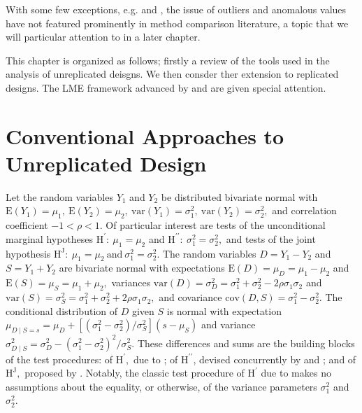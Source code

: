 \documentclass[12pt, a4paper]{report}
\theoremstyle{plain}
\theoremstyle{definition}
\theoremstyle{remark}
\begin{document}
With some few exceptions, e.g. \citet{hawkins1978} and \citet{Bartko}, the issue of outliers and anomalous values have not featured prominently in method comparison literature, a topic that we will particular attention to in a later chapter.


This chapter is organized as follows; firstly a review of the tools used in the analysis of unreplicated deisgns. We then consder ther extension to replicated designs. The LME framework advanced by \citet{BXC2008} and \citet{ARoy2009} are given special attention.





\section{Conventional Approaches to Unreplicated Design}  
Let the random variables $Y_1$ and $Y_2$ be distributed bivariate normal with $\mathrm{E}(Y_1)=\mu_1,\ \mathrm{E}(Y_2)=\mu_2,\ \mathrm{var}(Y_1)=\sigma^2_1,\ \mathrm{var}(Y_2)=\sigma^2_2,$ and correlation coefficient $-1<\rho<1.$ Of particular interest are tests of the unconditional marginal hypotheses $\textrm{H}^\prime\colon~\mu_1 = \mu_2$ and $\textrm{H}^{\prime\prime}\colon~\sigma^2_1 = \sigma^2_2,$ and tests of the joint hypothesis $\textrm{H}^\mathrm{J}\colon~\mu_1 = \mu_2\ \textrm{and}\ \sigma^2_1 = \sigma^2_2.$ The random variables $D=Y_1-Y_2$ and $S=Y_1+Y_2$ are bivariate normal with expectations $\mathrm{E}(D) = \mu_D = \mu_1- \mu_2$ and $\mathrm{E}(S) = \mu_S = \mu_1+ \mu_2,$ variances $\mathrm{var}(D) = \sigma^2_D = \sigma_1^2 + \sigma_2^2 - 2 \rho \sigma_1 \sigma_2$ and $\mathrm{var}(S) = \sigma^2_S = \sigma_1^2 + \sigma_2^2 + 2 \rho \sigma_1 \sigma_2,$ and covariance $\mathrm{cov}(D,S) = \sigma_1^2 - \sigma_2^2.$ The conditional distribution of $D$ given $S$ is normal with expectation $\mu_{D\mid S=s} = \mu_D + [ ( \sigma^2_1 - \sigma^2_2 ) / \sigma^2_S ] ( s - \mu_S )$ and variance $\sigma^2_{D\mid S} = \sigma^2_D - ( \sigma^2_1 - \sigma^2_2 )^2 / \sigma^2_S.$ These differences and sums are the building blocks of the test procedures: of $\textrm{H}^\prime,$ due to \cite{Student}; of $\textrm{H}^{\prime\prime}$, devised concurrently by \cite{pitman} and \cite{morgan}; and of $\textrm{H}^\mathrm{J},$ proposed by \citet{BB89}. Notably, the classic test procedure of $\textrm{H}^\prime$ due to \cite{Student} makes no assumptions about the equality, or otherwise, of the variance parameters $\sigma^2_1$ and $\sigma^2_2.$
\end{document}
